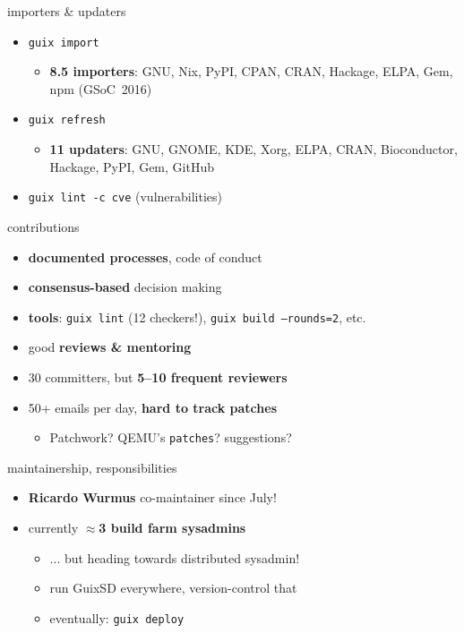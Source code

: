 \documentclass{beamer}
\newcommand{\highlight}[1]{\alert{\textbf{#1}}}
\begin{document}
\begin{frame}[fragile]{importers \& updaters}
  \Large{
  \begin{itemize}
  \item{\texttt{guix import}
    \begin{itemize}
    \item \highlight{8.5 importers}: GNU, Nix, PyPI, CPAN, CRAN,
      Hackage, ELPA, Gem, npm (GSoC~2016)
    \end{itemize}}
  \item{\texttt{guix refresh}
    \begin{itemize}
      \item \highlight{11 updaters}: GNU, GNOME, KDE, Xorg, ELPA, CRAN,
        Bioconductor, Hackage, PyPI, Gem, GitHub
    \end{itemize}}
  \item \texttt{guix lint -c cve} (vulnerabilities)
  \end{itemize}
  }
\end{frame}

\begin{frame}{contributions}
  \Large{
  \begin{itemize}
  \item \highlight{documented processes}, code of conduct
  \item \highlight{consensus-based} decision making
  \item \highlight{tools}: \texttt{guix lint} (12 checkers!),
    \texttt{guix build --rounds=2}, etc.
  \item good \highlight{reviews \& mentoring}
  \item<2-> 30 committers, but \highlight{5--10 frequent reviewers}
  \item<3->{50+ emails per day, \highlight{hard to track patches}
    \begin{itemize}
    \item Patchwork? QEMU's \texttt{patches}? suggestions?
    \end{itemize}}
  \end{itemize}
  }
\end{frame}

\begin{frame}{maintainership, responsibilities}
  \Large{
  \begin{itemize}
    \item \highlight{Ricardo Wurmus} co-maintainer since July!
    \item{currently \highlight{$\approx$3 build farm sysadmins}
      \begin{itemize}
      \item ... but heading towards distributed sysadmin!
      \item run GuixSD everywhere, version-control that
      \item eventually: \texttt{guix deploy}
      \end{itemize}}
  \end{itemize}
  }
\end{frame}
\end{document}

